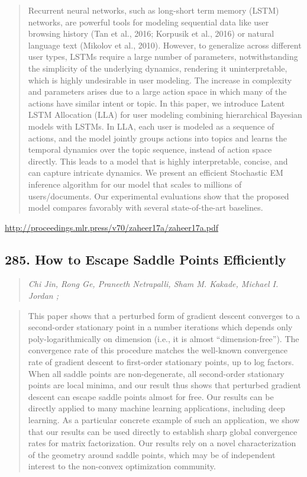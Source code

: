 \documentclass{article}
\begin{document}
\begin{quote}
    Recurrent neural networks, such as long-short term memory (LSTM) networks, are powerful tools for modeling sequential data like user browsing history (Tan et al., 2016; Korpusik et al., 2016) or natural language text (Mikolov et al., 2010). However, to generalize across different user types, LSTMs require a large number of parameters, notwithstanding the simplicity of the underlying dynamics, rendering it uninterpretable, which is highly undesirable in user modeling. The increase in complexity and parameters arises due to a large action space in which many of the actions have similar intent or topic. In this paper, we introduce Latent LSTM Allocation (LLA) for user modeling combining hierarchical Bayesian models with LSTMs. In LLA, each user is modeled as a sequence of actions, and the model jointly groups actions into topics and learns the temporal dynamics over the topic sequence, instead of action space directly. This leads to a model that is highly interpretable, concise, and can capture intricate dynamics. We present an efficient Stochastic EM inference algorithm for our model that scales to millions of users/documents. Our experimental evaluations show that the proposed model compares favorably with several state-of-the-art baselines.  \end{quote}

\href{http://proceedings.mlr.press/v70/zaheer17a/zaheer17a.pdf}{http://proceedings.mlr.press/v70/zaheer17a/zaheer17a.pdf}

\subsection{285. How to Escape Saddle Points Efficiently}

\begin{quote}
\footnotesize{\textit{Chi Jin, Rong Ge, Praneeth Netrapalli, Sham M. Kakade, Michael I. Jordan ;}}
\end{quote}

\begin{quote}
    This paper shows that a perturbed form of gradient descent converges to a second-order stationary point in a number iterations which depends only poly-logarithmically on dimension (i.e., it is almost “dimension-free”). The convergence rate of this procedure matches the well-known convergence rate of gradient descent to first-order stationary points, up to log factors. When all saddle points are non-degenerate, all second-order stationary points are local minima, and our result thus shows that perturbed gradient descent can escape saddle points almost for free. Our results can be directly applied to many machine learning applications, including deep learning. As a particular concrete example of such an application, we show that our results can be used directly to establish sharp global convergence rates for matrix factorization. Our results rely on a novel characterization of the geometry around saddle points, which may be of independent interest to the non-convex optimization community.  \end{quote}
\end{document}
